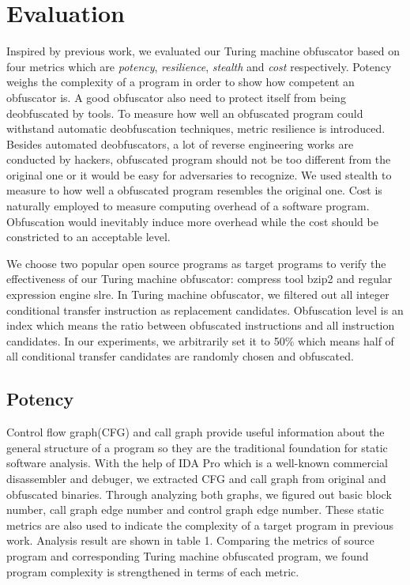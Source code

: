\documentclass[lnicst]{svmultln}
\begin{document}
\section{Evaluation}
Inspired by previous work\cite{Collberg}, we evaluated our Turing machine obfuscator based on four metrics which are \textit{potency}, \textit{resilience}, \textit{stealth} and \textit{cost} respectively. Potency weighs the complexity of a program in order to show how competent an obfuscator is. A good obfuscator also need to protect itself from being deobfuscated by tools. To measure how well an obfuscated program could withstand automatic deobfuscation techniques, metric resilience is introduced. Besides automated deobfuscators, a lot of reverse engineering works are conducted by hackers, obfuscated program should not be too different from the original one or it would be easy for adversaries to recognize. We used stealth to measure to how well a obfuscated program resembles the original one. Cost is naturally employed to measure computing overhead of a software program. Obfuscation would inevitably induce more overhead while the cost should be constricted to an acceptable level.

We choose two popular open source programs as target programs to verify the effectiveness of our Turing machine obfuscator: compress tool bzip2\cite{bzip2} and regular expression engine slre\cite{slre}. In Turing machine obfuscator, we filtered out all integer conditional transfer instruction as replacement candidates. Obfuscation level is an index which means the ratio between obfuscated instructions and all instruction candidates. In our experiments, we arbitrarily set it to 50\% which means half of all conditional transfer candidates are randomly chosen and obfuscated.
\subsection{Potency}
%
Control flow graph(CFG) and call  graph provide useful information about the general structure of a program so they are the traditional foundation for static software analysis. With the help of IDA Pro\cite{ida} which is a well-known commercial disassembler and debuger, we extracted CFG and call graph from original and obfuscated binaries. Through analyzing both graphs, we figured out basic block number, call graph edge number and control graph edge number. These static metrics are also used to indicate the complexity of a target program in previous work\cite{Chen}. Analysis result are shown in table 1. Comparing the metrics of source program and corresponding Turing machine obfuscated program, we found program complexity is strengthened in terms of each metric.
\end{document}
